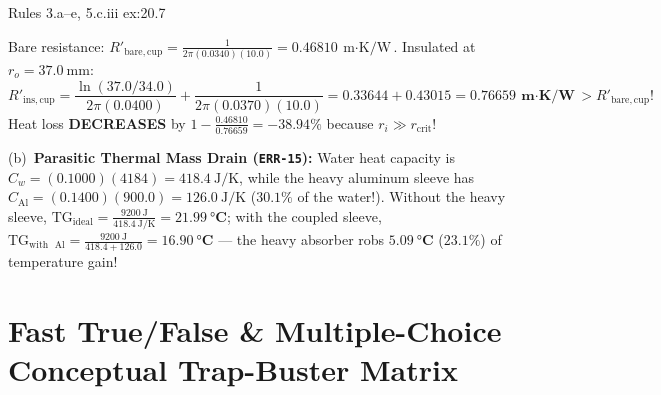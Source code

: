 \begin{workedexample}[Case Study 7 (\texttt{ERR-14}, \texttt{ERR-15}): Critical Radius Paradox ($r_{\mathrm{crit}} = k/h$) vs.\ 2027 Cup \& Parasitic Thermal Mass]{Rules 3.a--e, 5.c.iii }{ex:20.7}
\begin{itemize}
  Bare resistance: $R'_{\mathrm{bare,cup}} = \frac{1}{2\pi(0.0340)(10.0)} = \SI{0.46810}{\meter\cdot\kelvin\per\watt}$. Insulated at $r_o = \SI{37.0}{\milli\meter}$:
  $$R'_{\mathrm{ins,cup}} = \frac{\ln(37.0/34.0)}{2\pi(0.0400)} + \frac{1}{2\pi(0.0370)(10.0)} = 0.33644 + 0.43015 = \mathbf{\SI{0.76659}{\meter\cdot\kelvin\per\watt}} > R'_{\mathrm{bare,cup}}\text{!}$$
  Heat loss \textbf{DECREASES} by $1 - \frac{0.46810}{0.76659} = \mathbf{-38.94\%}$ because $r_i \gg r_{\mathrm{crit}}$!
\end{itemize}
(b)~\textbf{Parasitic Thermal Mass Drain (\texttt{ERR-15}):} Water heat capacity is $C_w = (0.1000)(4184) = \SI{418.4}{\joule\per\kelvin}$, while the heavy aluminum sleeve has $C_{\mathrm{Al}} = (0.1400)(900.0) = \SI{126.0}{\joule\per\kelvin}$ ($30.1\%$ of the water!). Without the heavy sleeve, $\mathrm{TG}_{\mathrm{ideal}} = \frac{\SI{9200}{\joule}}{\SI{418.4}{\joule\per\kelvin}} = \mathbf{\SI{21.99}{\celsius}}$; with the coupled sleeve, $\mathrm{TG}_{\mathrm{with\text{ }Al}} = \frac{\SI{9200}{\joule}}{418.4 + 126.0} = \mathbf{\SI{16.90}{\celsius}}$ --- the heavy absorber robs $\mathbf{\SI{5.09}{\celsius}}$ ($\mathbf{23.1\%}$) of temperature gain!
\end{workedexample}

\section{Fast True/False \& Multiple-Choice Conceptual Trap-Buster Matrix}\label{sec:20.6}

